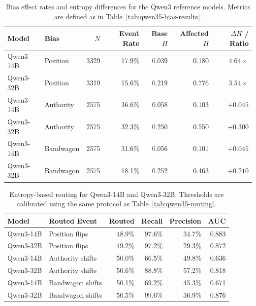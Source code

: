 \begin{table}[t]
\centering
\small
\setlength{\tabcolsep}{5pt}
\renewcommand{\arraystretch}{1.08}
\begin{tabular}{llrrrrr}
\toprule
Model & Bias & $N$ & Event Rate & Base $H$ & Affected $H$ & $\Delta H$ / Ratio \\
\midrule
Qwen3-14B & Position  & 3329 & 17.9\% & 0.039 & 0.180 & $4.64\times$ \\
Qwen3-32B & Position  & 3319 & 15.6\% & 0.219 & 0.776 & $3.54\times$ \\
Qwen3-14B & Authority & 2575 & 36.6\% & 0.058 & 0.103 & $+0.045$ \\
Qwen3-32B & Authority & 2575 & 32.3\% & 0.250 & 0.550 & $+0.300$ \\
Qwen3-14B & Bandwagon & 2575 & 31.6\% & 0.056 & 0.101 & $+0.045$ \\
Qwen3-32B & Bandwagon & 2575 & 18.1\% & 0.252 & 0.463 & $+0.210$ \\
\bottomrule
\end{tabular}
\caption{Bias effect rates and entropy differences for the Qwen3 reference
models. Metrics are defined as in Table~\ref{tab:qwen35-bias-results}.}
\label{tab:qwen3-bias-results}
\end{table}

\begin{table}[t]
\centering
\small
\setlength{\tabcolsep}{6pt}
\renewcommand{\arraystretch}{1.08}
\begin{tabular}{llrrrr}
\toprule
Model & Routed Event & Routed & Recall & Precision & AUC \\
\midrule
Qwen3-14B & Position flips   & 48.9\% & 97.6\% & 34.7\% & 0.883 \\
Qwen3-32B & Position flips   & 49.2\% & 97.2\% & 29.3\% & 0.872 \\
Qwen3-14B & Authority shifts & 50.0\% & 66.5\% & 49.8\% & 0.636 \\
Qwen3-32B & Authority shifts & 50.6\% & 88.8\% & 57.2\% & 0.818 \\
Qwen3-14B & Bandwagon shifts & 50.1\% & 69.2\% & 45.3\% & 0.671 \\
Qwen3-32B & Bandwagon shifts & 50.5\% & 99.6\% & 36.9\% & 0.876 \\
\bottomrule
\end{tabular}
\caption{Entropy-based routing for Qwen3-14B and Qwen3-32B. Thresholds are
calibrated using the same protocol as Table~\ref{tab:qwen35-routing}.}
\label{tab:qwen3-routing}
\end{table}

